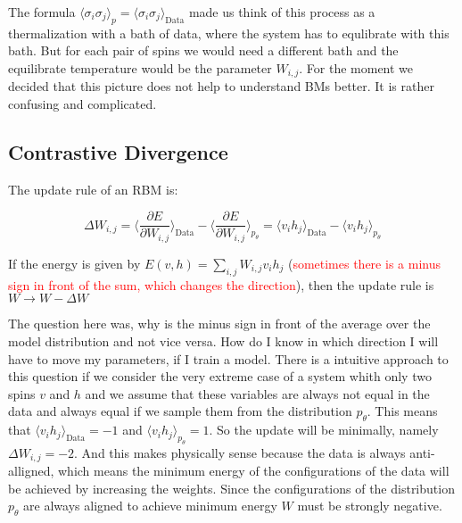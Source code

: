 \documentclass[nofootinbib, superscriptaddress, prl]{revtex4}
\begin{document}
The formula $\langle \sigma_i \sigma_j \rangle_p = \langle \sigma_i  \sigma_j \rangle_{\text{Data}}$ made us think of this process as a thermalization with a bath of data, where the system has to equlibrate with this bath. But for each pair of spins we would need a different bath and the equilibrate temperature would be the parameter $W_{i,j}$. For the moment we decided that this picture does not help to understand BMs better. It is rather confusing and complicated.

\subsection{Contrastive Divergence}

The update rule of an RBM is:

\begin{equation*}
	\Delta W_{i,j} = \langle \frac{ \partial E}{\partial W_{i,j}} \rangle_{\text{Data}} - \langle \frac{\partial E}{\partial W_{i,j}} \rangle_{p_{\theta}} = \langle v_i h_j \rangle_{\text{Data}} - \langle v_i h_j \rangle_{p_{\theta}}
\end{equation*}

If the energy is given by $E(v,h) = \sum_{i,j} W_{i,j} v_i h_j $ (\textcolor{red}{sometimes there is a minus sign in front of the sum, which changes the direction}), then the update rule is $W \rightarrow W - \Delta W$

The question here was, why is the minus sign in front of the average over the model distribution and not vice versa. How do I know in which direction I will have to move my parameters, if I train a model.
There is a intuitive approach to this question if we consider the very extreme case of a system whith only two spins $v$ and $h$ and we assume that these variables are always not equal in the data and always equal if we sample them from the distribution $p_{\theta}$. This means that $\langle v_i h_j \rangle_{\text{Data}} = -1$
 and $\langle v_i h_j \rangle_{p_{\theta}}  = 1$. So the update will be minimally, namely $\Delta W_{i,j} = -2$. And this makes physically sense because the data is always anti-alligned, which means the minimum energy of the configurations of the data will be achieved by increasing the weights. Since the configurations of the distribution $p_{\theta}$ are always aligned to achieve minimum energy $W$ must be strongly negative.
 
 
\end{document}
